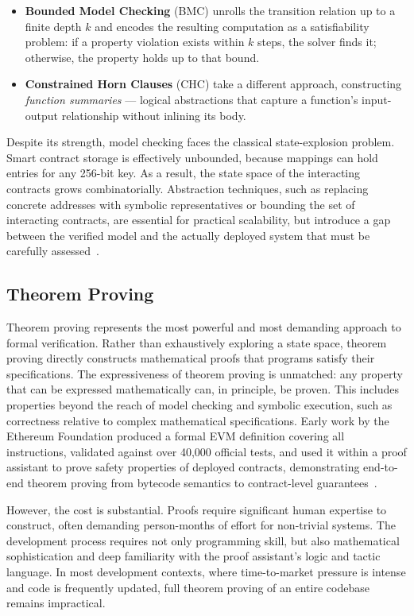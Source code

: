 \begin{itemize}
    \item \textbf{Bounded Model Checking} (BMC) unrolls the transition relation up to a finite depth $k$ and encodes the resulting computation as a satisfiability problem: if a property violation exists within $k$ steps, the solver finds it; otherwise, the property holds up to that bound.
    \item \textbf{Constrained Horn Clauses} (CHC) take a different approach, constructing \emph{function summaries} --- logical abstractions that capture a function's input-output relationship without inlining its body.
\end{itemize}

Despite its strength, model checking faces the classical state-explosion problem. Smart contract storage is effectively unbounded, because mappings can hold entries for any 256-bit key. As a result, the state space of the interacting contracts grows combinatorially. Abstraction techniques, such as replacing concrete addresses with symbolic representatives or bounding the set of interacting contracts, are essential for practical scalability, but introduce a gap between the verified model and the actually deployed system that must be carefully assessed~\cite{tolmach2021survey}.

\subsection{Theorem Proving}
\label{subsec:theorem-proving}

Theorem proving represents the most powerful and most demanding approach to formal verification. Rather than exhaustively exploring a state space, theorem proving directly constructs mathematical proofs that programs satisfy their specifications. The expressiveness of theorem proving is unmatched: any property that can be expressed mathematically can, in principle, be proven. This includes properties beyond the reach of model checking and symbolic execution, such as correctness relative to complex mathematical specifications. Early work by the Ethereum Foundation produced a formal EVM definition covering all instructions, validated against over 40{,}000 official tests, and used it within a proof assistant to prove safety properties of deployed contracts, demonstrating end-to-end theorem proving from bytecode semantics to contract-level guarantees~\cite{hirai2017defining}.

However, the cost is substantial. Proofs require significant human expertise to construct, often demanding person-months of effort for non-trivial systems. The development process requires not only programming skill, but also mathematical sophistication and deep familiarity with the proof assistant's logic and tactic language. In most development contexts, where time-to-market pressure is intense and code is frequently updated, full theorem proving of an entire codebase remains impractical.

